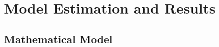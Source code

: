 \documentclass[12pt,dvipsnames]{article}%
\begin{document}


  






\section{Model Estimation and Results}

\subsection{Mathematical Model}

\end{document}
